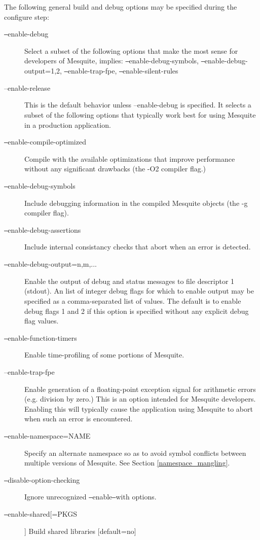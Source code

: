 \label{config_options}
The following general build and debug options may be specified during the configure step:
\begin{description}
\item[\texttt{--}enable-debug]  Select a subset of the following options that
make the most sense for developers of Mesquite, implies: \texttt{--}enable-debug-symbols, \texttt{--}enable-debug-output=1,2, \texttt{--}enable-trap-fpe,
                          \texttt{--}enable-silent-rules

\item[--enable-release]  This is the default behavior unless 
--enable-debug is specified.  It selects a subset of the following options that
typically work best for using Mesquite in a production application.
\item[\texttt{--}enable-compile-optimized] Compile with the available 
optimizations that improve performance without any significant drawbacks 
(the -O2 compiler flag.)
\item[\texttt{--}enable-debug-symbols] Include debugging information in
the compiled Mesquite objects (the -g compiler flag).
\item[\texttt{--}enable-debug-assertions]  Include internal consistancy 
checks that abort when an error is detected.
\item[\texttt{--}enable-debug-output=n,m,...]  Enable the output of
debug and status messages to file descriptor 1 (stdout).  An 
list of integer debug flags for which to enable output may be specified 
as a comma-separated list of values.  The default is to enable debug
flags 1 and 2 if this option is specified without any explicit debug
flag values.
\item[\texttt{--}enable-function-timers]  Enable time-profiling of
some portions of Mesquite.
\item[--enable-trap-fpe]  Enable generation of a floating-point
exception signal for arithmetic errors (e.g. division by zero.)  This is
an option intended for Mesquite developers.  Enabling this will typically cause
the application using Mesquite to abort when such an error is encountered.
\item[\texttt{--}enable-namespace=NAME]  Specify an alternate namespace so as to avoid
symbol conflicts between multiple versions of Mesquite.  See Section \ref{namespace_mangling}.
\item[\texttt{--}disable-option-checking]  Ignore unrecognized \texttt{--}enable\/\texttt{--}with options.
\item[\texttt{--}enable-shared[=PKGS]]  Build shared libraries [default=no]

\end{description}
